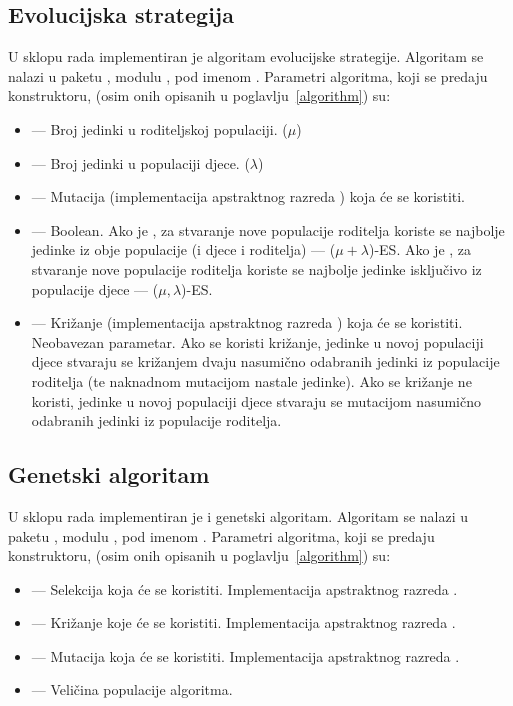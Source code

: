 \documentclass[times, utf8, zavrsni, numeric]{fer}
\begin{document}
\subsection{Evolucijska strategija}
U sklopu rada implementiran je algoritam evolucijske strategije. Algoritam se
nalazi u paketu , modulu , pod
imenom . Parametri algoritma, koji se predaju
konstruktoru, (osim onih opisanih u poglavlju~\ref{algorithm}) su:
\begin{itemize}
    \item {} --- Broj jedinki u roditeljskoj populaciji.
        ($\mu$)
    \item {} --- Broj jedinki u populaciji djece.
        ($\lambda$)
    \item {} --- Mutacija (implementacija apstraktnog razreda
        ) koja će se koristiti.
    \item {} --- Boolean. Ako je , za stvaranje nove
        populacije roditelja koriste se najbolje jedinke iz obje populacije (i
        djece i roditelja) --- ($\mu{} + \lambda$)-ES\@. Ako je ,
        za stvaranje nove populacije roditelja koriste se najbolje jedinke
        isključivo iz populacije djece --- ($\mu, \lambda$)-ES\@.
    \item {} --- Križanje (implementacija apstraktnog razreda
        ) koja će se koristiti. Neobavezan parametar. Ako se
        koristi križanje, jedinke u novoj populaciji djece stvaraju se križanjem
        dvaju nasumično odabranih jedinki iz populacije roditelja (te naknadnom
        mutacijom nastale jedinke). Ako se križanje ne koristi, jedinke u novoj
        populaciji djece stvaraju se mutacijom nasumično odabranih jedinki iz
        populacije roditelja.
\end{itemize}

\subsection{Genetski algoritam}
U sklopu rada implementiran je i genetski algoritam. Algoritam se nalazi u
paketu , modulu , pod imenom
. Parametri algoritma, koji se predaju konstruktoru,
(osim onih opisanih u poglavlju~\ref{algorithm}) su:
\begin{itemize}
    \item {} --- Selekcija koja će se koristiti. Implementacija
        apstraktnog razreda .
    \item {} --- Križanje koje će se koristiti. Implementacija
        apstraktnog razreda .
    \item {} --- Mutacija koja će se koristiti. Implementacija
        apstraktnog razreda .
    \item {} --- Veličina populacije algoritma.
\end{itemize}
\end{document}
